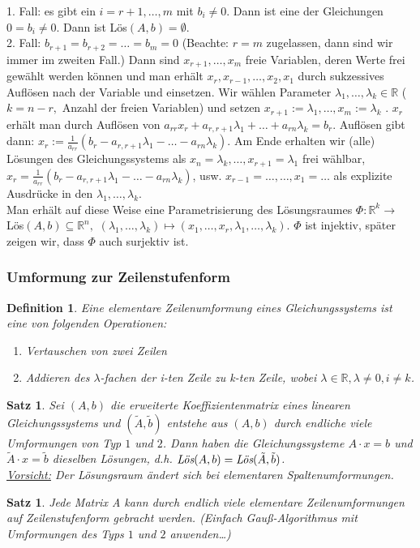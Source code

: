 \documentclass[12pt,a4paper]{article}
\theoremstyle{plain}
\newtheorem{Satz}[Theorem]{Satz}
\newtheorem{Definition}[Theorem]{Definition}
\newcommand{\R}{\mathbb{R}}
\numberwithin{equation}{section}
\begin{document}
1. Fall: es gibt ein $i=r+1,\ldots,m$ mit $b_i\neq 0$. Dann ist eine der Gleichungen $0=b_i\neq 0$. Dann ist Lös$(A,b)=\emptyset$.\\
2. Fall: $b_{r+1}=b_{r+2}=\ldots=b_m=0$ (Beachte: $r=m$ zugelassen, dann sind wir immer im zweiten Fall.) Dann sind $x_{r+1},\ldots,x_m$ freie Variablen, deren Werte frei gewählt werden können und man erhält $x_r,x_{r-1},\ldots,x_2,x_1$ durch sukzessives Auflösen nach der Variable und einsetzen. Wir wählen Parameter $\lambda_1,\ldots,\lambda_k\in\R$ ($k=n-r,$ Anzahl der freien Variablen) und setzen $x_{r+1}:=\lambda_1,\ldots, x_m:=\lambda_k$ . $x_r$ erhält man durch Auflösen von $a_{rr}x_r+a_{r,r+1}\lambda_1+\ldots+a_{rn}\lambda_k=b_r$. Auflösen gibt dann: $x_r:=\frac{1}{a_{rr}}(b_r-a_{r,r+1}\lambda_1-\ldots-a_{rn}\lambda_k)$. Am Ende erhalten wir (alle) Lösungen des Gleichungssystems als $x_n=\lambda_k,\ldots,x_{r+1}=\lambda_1$ frei wählbar, $x_r=\frac{1}{a_{rr}}(b_r-a_{r,r+1}\lambda_1-\ldots-a_{rn}\lambda_k)$, usw. $x_{r-1}=\ldots,\ldots,x_1=\ldots$ als explizite Ausdrücke in den $\lambda_1, \ldots,\lambda_k$. \\
Man erhält auf diese Weise eine Parametrisierung des Lösungsraumes $\Phi:\R^k \rightarrow $ Lös$(A,b)\subseteq \R^n,$ $(\lambda_1,\ldots,\lambda_k)\mapsto (x_1,\ldots,x_r,\lambda_1,\ldots,\lambda_k)$. $\Phi$ ist injektiv, später zeigen wir, dass $\Phi$ auch surjektiv ist.
\subsubsection{Umformung zur Zeilenstufenform}
\begin{Definition}
Eine elementare Zeilenumformung eines Gleichungssystems ist eine von folgenden Operationen: \begin{enumerate}
\renewcommand{\labelenumi}{\emph{\arabic{enumi}.}}
\item Vertauschen von zwei Zeilen
\item Addieren des $\lambda$-fachen der i-ten Zeile zu k-ten Zeile, wobei $\lambda\in\R,\lambda\neq 0,i\neq k$.
\end{enumerate}
\end{Definition}
\begin{Satz}
Sei $(A,b)$ die erweiterte Koeffizientenmatrix eines linearen Gleichungssystems und $(\tilde{A},\tilde{b})$ entstehe aus $(A,b)$ durch endliche viele Umformungen von Typ $1$ und $2$. Dann haben die Gleichungssysteme $A\cdot x=b$ und $\tilde{A}\cdot x=\tilde{b}$ dieselben Lösungen, d.h. $\emph{Lös}(A,b)=\emph{Lös}(\tilde{A},\tilde{b})$.\\
\underline{Vorsicht:} Der Lösungsraum ändert sich bei elementaren Spaltenumformungen.
\end{Satz}
\begin{Satz}
Jede Matrix A kann durch endlich viele elementare Zeilenumformungen auf Zeilenstufenform gebracht werden. (Einfach Gauß-Algorithmus mit Umformungen des Typs $1$ und $2$ anwenden\ldots)
\end{Satz}
\end{document}
